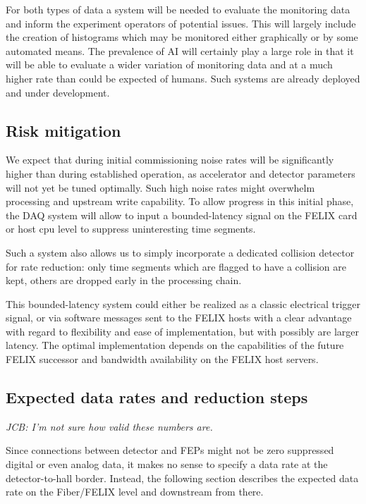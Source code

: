 For both types of data a system will be needed to evaluate the monitoring data and inform the experiment operators of potential issues. This will largely include the creation of histograms which may be monitored either graphically or by some automated means. The prevalence of AI will certainly play a large role in that it will be able to evaluate a wider variation of monitoring data and at a much higher rate than could be expected of humans. Such systems are already deployed and under development\cite{Hydra2021}. 

\subsection{Risk mitigation}
We expect that during initial commissioning noise rates will be significantly higher than during established operation, as accelerator and detector parameters will not yet be tuned optimally. Such high noise rates might overwhelm processing and upstream write capability. To allow progress in this initial phase, the DAQ system will allow to input a bounded-latency signal on the FELIX card or host cpu level to suppress uninteresting time segments.

Such a system also allows us to simply incorporate a dedicated collision detector for rate reduction: only time segments which are flagged to have a collision are kept, others are dropped early in the processing chain. 

This bounded-latency system could either be realized as a classic electrical trigger signal, or via software messages sent to the FELIX hosts with a clear advantage with regard to flexibility and ease of implementation, but with possibly are larger latency. The optimal implementation depends on the capabilities of the future FELIX successor and bandwidth availability on the FELIX host servers.

\subsection{Expected data rates and reduction steps}

\emph{JCB: I'm not sure how valid these numbers are.}

Since connections between detector and FEPs might not be zero suppressed digital or even analog data, it makes no sense to specify a data rate at the detector-to-hall border. Instead, the following section describes the expected data rate on the Fiber/FELIX level and downstream from there.

